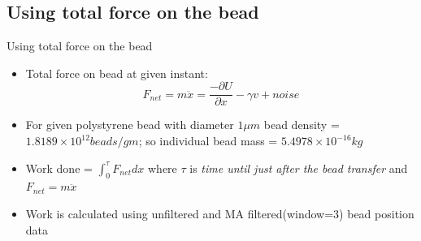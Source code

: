 \documentclass{beamer}
\begin{document}
\subsection{Using total force on the bead}
\begin{frame}{Using total force on the bead}

\begin{itemize}

\item Total force on bead at given instant:
\begin{equation*}
F_{net}=m \ddot{x}= \frac{-\partial U}{\partial x}-\gamma v + noise
\end{equation*}
\item For given polystyrene bead with diameter $1\mu m$ bead density =$1.8189\times 10^{12}beads/gm$; so individual bead mass = $5.4978\times 10^{-16} kg$
\item Work done = $\int_{0}^{\tau} F_{net}dx$ where $\tau$ is \textit{time until just after the bead transfer} and $F_{net}=m \ddot{x}$
\item Work is calculated using unfiltered and MA filtered(window=3) bead position data

\end{itemize}

\end{frame}
\end{document}
